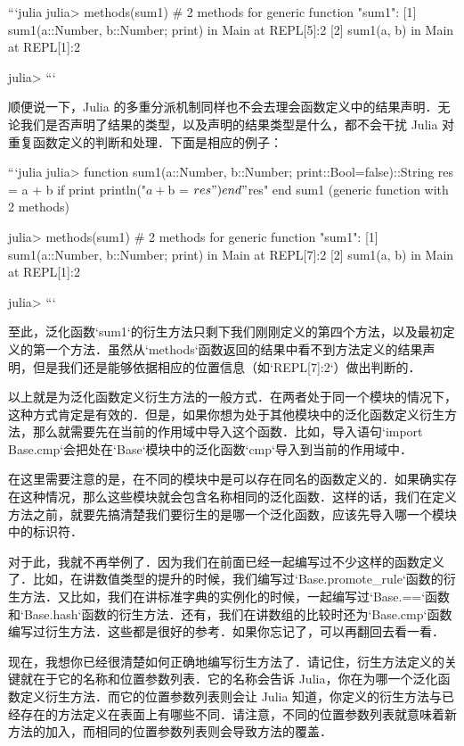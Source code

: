 ```julia
julia> methods(sum1)
# 2 methods for generic function "sum1":
[1] sum1(a::Number, b::Number; print) in Main at REPL[5]:2
[2] sum1(a, b) in Main at REPL[1]:2

julia> 
```

顺便说一下，Julia 的多重分派机制同样也不会去理会函数定义中的结果声明．无论我们是否声明了结果的类型，以及声明的结果类型是什么，都不会干扰 Julia 对重复函数定义的判断和处理．下面是相应的例子：

```julia
julia> function sum1(a::Number, b::Number; print::Bool=false)::String
           res = a + b
           if print
               println("$a + $b = $res")
           end
           "$res"
       end
sum1 (generic function with 2 methods)

julia> methods(sum1)
# 2 methods for generic function "sum1":
[1] sum1(a::Number, b::Number; print) in Main at REPL[7]:2
[2] sum1(a, b) in Main at REPL[1]:2

julia> 
```

至此，泛化函数`sum1`的衍生方法只剩下我们刚刚定义的第四个方法，以及最初定义的第一个方法．虽然从`methods`函数返回的结果中看不到方法定义的结果声明，但是我们还是能够依据相应的位置信息（如`REPL[7]:2`）做出判断的．

以上就是为泛化函数定义衍生方法的一般方式．在两者处于同一个模块的情况下，这种方式肯定是有效的．但是，如果你想为处于其他模块中的泛化函数定义衍生方法，那么就需要先在当前的作用域中导入这个函数．比如，导入语句`import Base.cmp`会把处在`Base`模块中的泛化函数`cmp`导入到当前的作用域中．

在这里需要注意的是，在不同的模块中是可以存在同名的函数定义的．如果确实存在这种情况，那么这些模块就会包含名称相同的泛化函数．这样的话，我们在定义方法之前，就要先搞清楚我们要衍生的是哪一个泛化函数，应该先导入哪一个模块中的标识符．

对于此，我就不再举例了．因为我们在前面已经一起编写过不少这样的函数定义了．比如，在讲数值类型的提升的时候，我们编写过`Base.promote_rule`函数的衍生方法．又比如，我们在讲标准字典的实例化的时候，一起编写过`Base.==`函数和`Base.hash`函数的衍生方法．还有，我们在讲数组的比较时还为`Base.cmp`函数编写过衍生方法．这些都是很好的参考．如果你忘记了，可以再翻回去看一看．

现在，我想你已经很清楚如何正确地编写衍生方法了．请记住，衍生方法定义的关键就在于它的名称和位置参数列表．它的名称会告诉 Julia，你在为哪一个泛化函数定义衍生方法．而它的位置参数列表则会让 Julia 知道，你定义的衍生方法与已经存在的方法定义在表面上有哪些不同．请注意，不同的位置参数列表就意味着新方法的加入，而相同的位置参数列表则会导致方法的覆盖．

